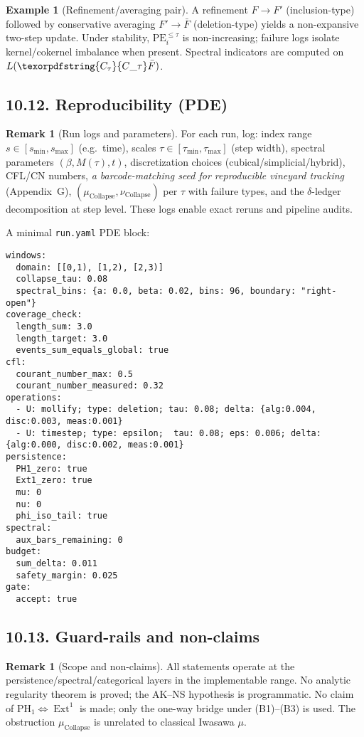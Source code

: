 \documentclass[11pt]{article}
\numberwithin{equation}{section}
\theoremstyle{plain}
\theoremstyle{definition}
\theoremstyle{remark}
\DeclareMathOperator{\Ext}{Ext}
\DeclareRobustCommand{\hyp}{\nobreakdash-}
\theoremstyle{plain}
\theoremstyle{definition}
\numberwithin{equation}{section}
\theoremstyle{definition}
\newtheorem{example}[theorem]{Example}
\newtheorem{remark}[theorem]{Remark}
\DeclareRobustCommand{\Ctau}{\texorpdfstring{\ensuremath{C_{\tau}}}{C\_\tau}}
\DeclareRobustCommand{\muc}{\mu_{\mathrm{Collapse}}}
\DeclareRobustCommand{\nuc}{\nu_{\mathrm{Collapse}}}
\numberwithin{equation}{section}
\theoremstyle{plain}
\theoremstyle{definition}
\theoremstyle{remark}
\providecommand{\Cfun}[1]{\mathsf{C}_{#1}}
\providecommand{\Ctau}{\Cfun{\tau}}
\providecommand{\muc}{\mu_{\mathrm{Collapse}}}
\providecommand{\nuc}{\nu_{\mathrm{Collapse}}}
\begin{document}
\begin{example}[Refinement/averaging pair]
A refinement \(F\to F'\) (inclusion\hyp type) followed by conservative averaging \(F'\to \bar{F}\) (deletion\hyp type) yields a non\hyp expansive two\hyp step update.
Under stability, \(\mathrm{PE}_i^{\le \tau}\) is non\hyp increasing; failure logs isolate kernel/cokernel imbalance when present.
Spectral indicators are computed on \(L(\Ctau \bar{F})\).
\end{example}

\subsection*{10.12. Reproducibility (PDE)}
\begin{remark}[Run logs and parameters]\label{rk:10-logs}
For each run, log: index range \(s\in[s_{\min},s_{\max}]\) (e.g.\ time), scales \(\tau\in[\tau_{\min},\tau_{\max}]\) (step width), spectral parameters \((\beta,M(\tau),t)\), discretization choices (cubical/simplicial/hybrid), CFL/CN numbers, \emph{a barcode\hyp matching seed for reproducible vineyard tracking} (Appendix~G), \((\muc,\nuc)\) per \(\tau\) with failure types, and the \(\delta\)\hyp ledger decomposition at step level.
These logs enable exact reruns and pipeline audits.
\end{remark}

\noindent A minimal \texttt{run.yaml} PDE block:

\begin{verbatim}
windows:
  domain: [[0,1), [1,2), [2,3)]
  collapse_tau: 0.08
  spectral_bins: {a: 0.0, beta: 0.02, bins: 96, boundary: "right-open"}
coverage_check:
  length_sum: 3.0
  length_target: 3.0
  events_sum_equals_global: true
cfl:
  courant_number_max: 0.5
  courant_number_measured: 0.32
operations:
  - U: mollify; type: deletion; tau: 0.08; delta: {alg:0.004, disc:0.003, meas:0.001}
  - U: timestep; type: epsilon;  tau: 0.08; eps: 0.006; delta: {alg:0.000, disc:0.002, meas:0.001}
persistence:
  PH1_zero: true
  Ext1_zero: true
  mu: 0
  nu: 0
  phi_iso_tail: true
spectral:
  aux_bars_remaining: 0
budget:
  sum_delta: 0.011
  safety_margin: 0.025
gate:
  accept: true
\end{verbatim}

\subsection*{10.13. Guard\hyp rails and non\hyp claims}
\begin{remark}[Scope and non\hyp claims]\label{rk:10-guard}
All statements operate at the persistence/spectral/categorical layers in the implementable range.
No analytic regularity theorem is proved; the AK–NS hypothesis is programmatic.
No claim of \(\mathrm{PH}_1\Leftrightarrow\Ext^1\) is made; only the one\hyp way bridge under (B1)–(B3) is used.
The obstruction \(\muc\) is unrelated to classical Iwasawa \(\mu\).
\end{remark}
\end{document}
